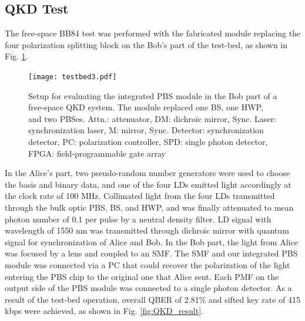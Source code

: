 \documentclass[letterpaper, 10pt]{article}
\begin{document}
\subsection{QKD Test}
The free-space BB84 test was performed with the fabricated module replacing the four polarization splitting block on the Bob's part of the test-bed, as shown in Fig. \ref{fig:testbed}.
\begin{figure}
  \centering
  \texttt{[image: testbed3.pdf]}
  \caption{Setup for evaluating the integrated PBS module in the Bob part of a free-space QKD system. The module replaced one BS, one HWP, and two PBSes. Attn.: attenuator, DM: dichroic mirror, Sync. Laser: synchronization laser, M: mirror, Sync. Detector: synchronization detector, PC: polarization controller, SPD: single photon detector, FPGA: field-programmable gate array}
  \label{fig:testbed}
\end{figure}
In the Alice's part, two pseudo-random number generators were used to choose the basis and binary data, and one of the four LDs emitted light accordingly at the clock rate of 100 MHz.
Collimated light from the four LDs transmitted  through the bulk optic PBS, BS, and HWP, and was finally attenuated to mean photon number of 0.1 per pulse by a neutral density filter.
LD signal with wavelength of 1550 nm was transmitted through dichroic mirror with quantum signal for synchronization of Alice and Bob.
In the Bob part, the light from Alice was  focused by a lens and coupled to an SMF.
The SMF and our integrated PBS module was connected via a PC that could recover the polarization of the light entering the PBS chip to the original one that Alice sent.
Each PMF on the output side of the PBS module was connected to a single photon detector.
As a result of the test-bed operation, overall QBER of 2.81\% and sifted key rate of 415 kbps were achieved, as shown in Fig. \ref{fig:QKD_result}.
\end{document}
